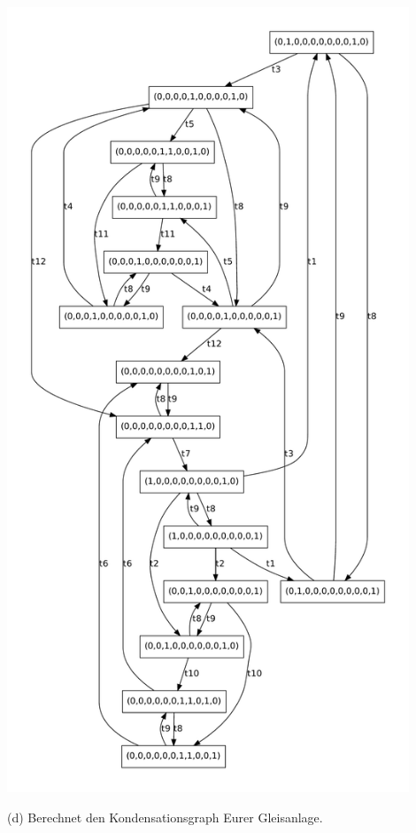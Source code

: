 \documentclass{scrreprt}
\begin{document}
\begin{enumerate}
\includegraphics[width=0.9\textwidth]{eg_easy.pdf}

(d) Berechnet den Kondensationsgraph Eurer Gleisanlage.


\end{enumerate}
\end{document}
